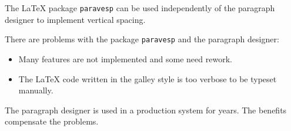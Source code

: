 \documentclass[]{ltugboat}
\begin{document}
The \LaTeX{} package \verb|paravesp| can be used independently of the paragraph designer to implement vertical spacing.

There are problems with the package \verb|paravesp| and the paragraph designer:

\begin{itemize}
\item Many features are not implemented and some need rework.
\item The \LaTeX{} code written in the galley style is too verbose to be typeset manually.
\end{itemize}

The paragraph designer is used in a production system for years. The benefits compensate the problems.
\end{document}
